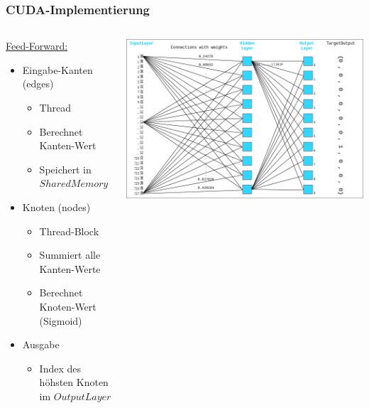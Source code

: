 \documentclass[xcolor=pdftex,dvipsnames,table]{beamer}
\begin{document}
	\begin{frame}
		\frametitle{CUDA-Implementierung}
		\begin{columns}
			\begin{column}{0.5\textwidth}
				\underline{Feed-Forward:}
				\begin{itemize}
					\item Eingabe-Kanten (edges)
					\begin{itemize}
						\item Thread
						\item Berechnet Kanten-Wert
						\item Speichert in $Shared Memory$
					\end{itemize}
					\item Knoten (nodes)
					\begin{itemize}
						\item Thread-Block
						\item Summiert alle Kanten-Werte
						\item Berechnet Knoten-Wert (Sigmoid)
					\end{itemize}
					\item Ausgabe
					\begin{itemize}
						\item Index des höhsten Knoten im $OutputLayer$
					\end{itemize}
				\end{itemize}
			\end{column}
			\begin{column}{0.6\textwidth}
				\includegraphics[width=1\textwidth]{nn.png}
			\end{column}
		\end{columns}
	\end{frame}
\end{document}
